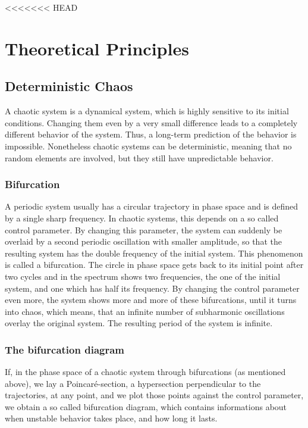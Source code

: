 <<<<<<< HEAD
\section{Theoretical Principles}

\subsection{Deterministic Chaos}

A chaotic system is a dynamical system, which is highly sensitive to its initial conditions. Changing them even by a very small difference leads to a completely different behavior of the system. Thus, a long-term prediction of the behavior is impossible. Nonetheless chaotic systems can be deterministic, meaning that no random elements are involved, but they still have unpredictable behavior.

\subsubsection{Bifurcation}

A periodic system usually has a circular trajectory in phase space and is defined by a single sharp frequency. In chaotic systems, this depends on a so called control parameter. By changing this parameter, the system can suddenly be overlaid by a second periodic oscillation with smaller amplitude, so that the resulting system has the double frequency of the initial system. This phenomenon is called a bifurcation. The circle in phase space gets back to its initial point after two cycles and in the spectrum shows two frequencies, the one of the initial system, and one which has half its frequency. By changing the control parameter even more, the system shows more and more of these bifurcations, until it turns into chaos, which means, that an infinite number of subharmonic oscillations overlay the original system. The resulting period of the system is infinite.

\subsubsection{The bifurcation diagram}

If, in the phase space of a chaotic system through bifurcations (as mentioned above), we lay a Poincaré-section, a hypersection perpendicular to the trajectories, at any point, and we plot those points against the control parameter, we obtain a so called bifurcation diagram, which contains informations about when unstable behavior takes place, and how long it lasts.

